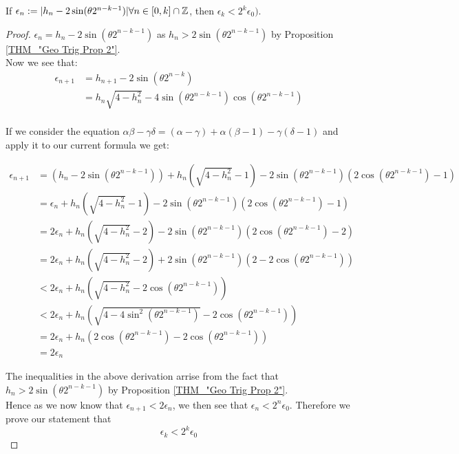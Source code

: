 \begin{Geo Trig Prop 3}
\label{THM_"Geo Trig Prop 3"}
If \(\epsilon_n := |h_n - 2\sin(\theta2^{n-k-1})| \forall n \in [0,k] \cap \mathbb{Z}\), then \(\epsilon_k < 2^k\epsilon_0)\).
\end{Geo Trig Prop 3}
\begin{proof}
\(\epsilon_n = h_n - 2\sin(\theta2^{n-k-1})\) as \(h_n > 2\sin(\theta2^{n-k-1})\) by Proposition \ref{THM_"Geo Trig Prop 2"}.\\

Now we see that:
\begin{displaymath}
\begin{align*}
	\epsilon_{n+1} &= h_{n+1} - 2\sin(\theta2^{n-k})\\
		&= h_n\sqrt{4-h_n^2} 
			- 4\sin(\theta2^{n-k-1})\cos(\theta2^{n-k-1})\\
\end{align*}
\end{displaymath}

If we consider the equation \(\alpha\beta - \gamma\delta = (\alpha - \gamma) + \alpha(\beta - 1) - \gamma(\delta - 1)\) and apply it to our current formula we get:

\begin{displaymath}
\begin{align*}
	\epsilon_{n+1} &= (h_n - 2\sin(\theta2^{n-k-1})) 
						+ h_n(\sqrt{4 - h_n^2} - 1)
						- 2\sin(\theta2^{n-k-1})(2\cos(\theta2^{n-k-1}) - 1)\\
		&= \epsilon_n + h_n(\sqrt{4 - h_n^2} - 1)
			-2\sin(\theta2^{n-k-1})(2\cos(\theta2^{n-k-1}) - 1)\\
		&= 2\epsilon_n + h_n(\sqrt{4 - h_n^2} - 2)
			-2\sin(\theta2^{n-k-1})(2\cos(\theta2^{n-k-1}) - 2)\\
		&= 2\epsilon_n + h_n(\sqrt{4 - h_n^2} - 2)
			+2\sin(\theta2^{n-k-1})(2 - 2\cos(\theta2^{n-k-1}))\\
		&< 2\epsilon_n + h_n(\sqrt{4 - h_n^2} - 2\cos(\theta2^{n-k-1}))\\
		&< 2\epsilon_n + h_n(\sqrt{4 - 4\sin^2(\theta2^{n-k-1})}
			- 2\cos(\theta2^{n-k-1}))\\
		&= 2\epsilon_n + h_n(2\cos(\theta2^{n-k-1}) 
			- 2\cos(\theta2^{n-k-1}))\\
		&= 2\epsilon_n
\end{align*}
\end{displaymath}

The inequalities in the above derivation arrise from the fact that \(h_n > 2\sin(\theta2^{n-k-1})\) by Proposition \ref{THM_"Geo Trig Prop 2"}.\\

Hence as we now know that \(\epsilon_{n+1} < 2\epsilon_n\), we then see that \(\epsilon_n < 2^n\epsilon_0\). Therefore we prove our statement that
\[\epsilon_k < 2^k\epsilon_0\]
\end{proof}

